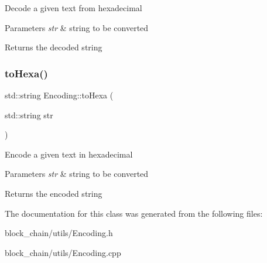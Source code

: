 Decode a given text from hexadecimal


\begin{DoxyParams}{Parameters}
{\em str} & string to be converted \\
\hline
\end{DoxyParams}
\begin{DoxyReturn}{Returns}
the decoded string 
\end{DoxyReturn}
\mbox{\label{classEncoding_afa3343b66a1a0598b2dc01d74cb81861}} 
\subsubsection{\texorpdfstring{to\+Hexa()}{toHexa()}}
{\footnotesize\ttfamily std\+::string Encoding\+::to\+Hexa (\begin{DoxyParamCaption}\item[{std\+::string}]{str }\end{DoxyParamCaption})\hspace{0.3cm}{\ttfamily [static]}}

Encode a given text in hexadecimal


\begin{DoxyParams}{Parameters}
{\em str} & string to be converted \\
\hline
\end{DoxyParams}
\begin{DoxyReturn}{Returns}
the encoded string 
\end{DoxyReturn}


The documentation for this class was generated from the following files\+:\begin{DoxyCompactItemize}
\item 
block\+\_\+chain/utils/Encoding.\+h\item 
block\+\_\+chain/utils/Encoding.\+cpp\end{DoxyCompactItemize}
